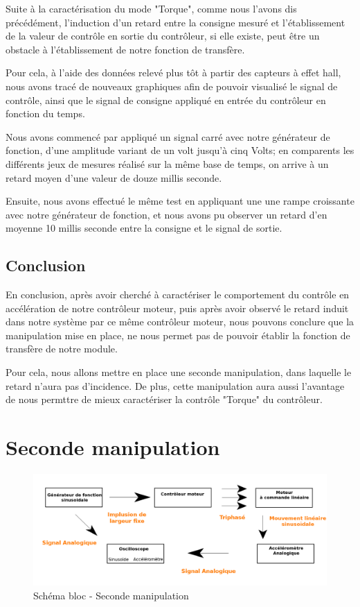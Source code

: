 \documentclass[french,a4paper,12pt]{report}
\begin{document}
		Suite à la caractérisation du mode "Torque", comme nous l'avons dis précédément, l'induction d'un retard entre la consigne mesuré et l'établissement de la valeur de contrôle en sortie du contrôleur, si elle existe, peut être un obstacle à l'établissement de notre fonction de transfère.
		
		Pour cela, à l'aide des données relevé plus tôt à partir des capteurs à effet hall, nous avons tracé de nouveaux graphiques afin de pouvoir visualisé le signal de contrôle, ainsi que le signal de consigne appliqué en entrée du contrôleur en fonction du temps.
		
		Nous avons commencé par appliqué un signal carré avec notre générateur de fonction, d'une amplitude variant de un volt jusqu'à cinq Volts; en comparents les différents jeux de mesures réalisé sur la même base de temps, on arrive à un retard moyen d'une valeur de douze millis seconde.
		
		Ensuite, nous avons effectué le même test en appliquant une une rampe croissante avec notre générateur de fonction, et nous avons pu observer un retard d'en moyenne 10 millis seconde entre la consigne et le signal de sortie.
		
		\subsection{Conclusion}
		En conclusion, après avoir cherché à caractériser le comportement du contrôle en accélération de notre contrôleur moteur, puis après avoir observé le retard induit dans notre système par ce même contrôleur moteur, nous pouvons conclure que la manipulation mise en place, ne nous permet pas de pouvoir établir la fonction de transfère de notre module.
		
		Pour cela, nous allons mettre en place une seconde manipulation, dans laquelle le retard n'aura pas d'incidence. De plus, cette manipulation aura aussi l'avantage de nous permttre de mieux caractériser la contrôle "Torque" du contrôleur.
		
		\newpage		
		
	\section{Seconde manipulation}
	
		
		
	\begin{figure}[!ht]
    \center
  	\includegraphics[width=18cm]{manip2.png}
    \caption{Schéma bloc - Seconde manipulation}
	\end{figure}	
		
\end{document}
